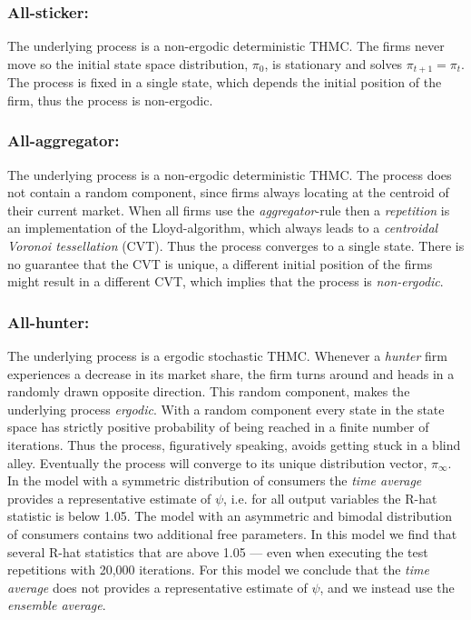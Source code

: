 \documentclass[preprint, 12pt]{elsarticle}
\begin{document}
\subsubsection*{All-sticker:}
The underlying process is a non-ergodic deterministic THMC. The firms never move so the initial state space distribution, $\pi_0$, is stationary and solves $\pi_{t+1} = \pi_t$. The process is fixed in a single state, which depends the initial position of the firm, thus the process is non-ergodic.

\subsubsection*{All-aggregator:}
The underlying process is a non-ergodic deterministic THMC. The process does not contain a random component, since firms always locating at the centroid of their current market. When all firms use the \emph{aggregator}-rule then a \emph{repetition} is an implementation of the Lloyd-algorithm, which always leads to a \emph{centroidal Voronoi tessellation} (CVT). Thus the process converges to a single state. There is no guarantee that the CVT is unique, a different initial position of the firms might result in a different CVT, which implies that the process is \emph{non-ergodic}.

\subsubsection*{All-hunter:}
The underlying process is a ergodic stochastic THMC. Whenever a \emph{hunter} firm experiences a decrease in its market share, the firm turns around and heads in a randomly drawn opposite direction. This random component, makes the underlying process \emph{ergodic}. With a random component every state in the state space has strictly positive probability of being reached in a finite number of iterations. Thus the process, figuratively speaking, avoids getting stuck in a blind alley. Eventually the process will converge to its unique distribution vector, $\pi_\infty$. In the model with a symmetric distribution of consumers the \emph{time average} provides a representative estimate of $\psi$, i.e. for all output variables the R-hat statistic is below 1.05. The model with an asymmetric and bimodal distribution of consumers contains two additional free parameters. In this model we find that several R-hat statistics that are above 1.05 — even when executing the test repetitions with 20,000 iterations. For this model we conclude that the \emph{time average} does not provides a representative estimate of $\psi$, and we instead use the \emph{ensemble average}. 
\end{document}
